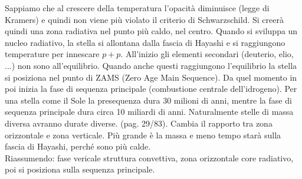 Sappiamo che al crescere della temperatura l'opacità diminuisce (legge di Kramers) e quindi non viene più violato il criterio di Schwarzschild. Si creerà quindi una zona radiativa nel punto più caldo, nel centro. Quando si sviluppa un nucleo radiativo, la stella si allontana dalla fascia di Hayashi e si raggiungono temperature per innescare $p+p$. All'inizio gli elementi secondari (deuterio, elio, ...) non sono all'equilibrio. Quando anche questi raggiungono l'equilibrio la stella si posiziona nel punto di ZAMS (Zero Age Main Sequence). Da quel momento in poi inizia la fase di sequenza principale (combustione centrale dell'idrogeno). Per una stella come il Sole la presequenza dura 30 milioni di anni, mentre la fase di sequenza principale dura circa 10 miliardi di anni. Naturalmente stelle di massa diversa avranno durate diverse. (pag. 29/83). Cambia il rapporto tra zona orizzontale e zona verticale. Più grande è la massa e meno tempo starà sulla fascia di Hayashi, perché sono più calde. \\
Riassumendo: fase vericale struttura convettiva, zona orizzontale core radiativo, poi si posiziona sulla sequenza principale.